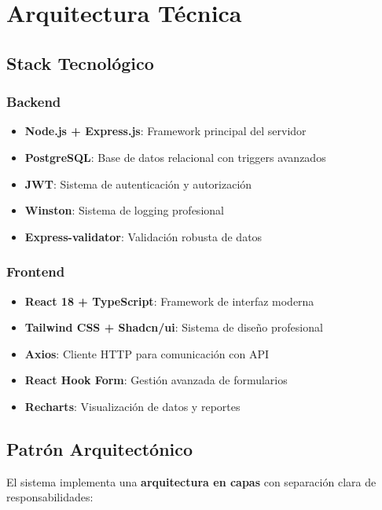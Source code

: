 \documentclass[12pt,a4paper]{article}
\newcommand{\highlight}[1]{\textcolor{primaryblue}{\textbf{#1}}}
\begin{document}

\section{Arquitectura Técnica}

\subsection{Stack Tecnológico}

\subsubsection{Backend}
\begin{itemize}[leftmargin=*]
    \item \highlight{Node.js + Express.js}: Framework principal del servidor
    \item \highlight{PostgreSQL}: Base de datos relacional con triggers avanzados
    \item \highlight{JWT}: Sistema de autenticación y autorización
    \item \highlight{Winston}: Sistema de logging profesional
    \item \highlight{Express-validator}: Validación robusta de datos
\end{itemize}

\subsubsection{Frontend}
\begin{itemize}[leftmargin=*]
    \item \highlight{React 18 + TypeScript}: Framework de interfaz moderna
    \item \highlight{Tailwind CSS + Shadcn/ui}: Sistema de diseño profesional
    \item \highlight{Axios}: Cliente HTTP para comunicación con API
    \item \highlight{React Hook Form}: Gestión avanzada de formularios
    \item \highlight{Recharts}: Visualización de datos y reportes
\end{itemize}

\subsection{Patrón Arquitectónico}
El sistema implementa una \highlight{arquitectura en capas} con separación clara de responsabilidades:
\end{document}
